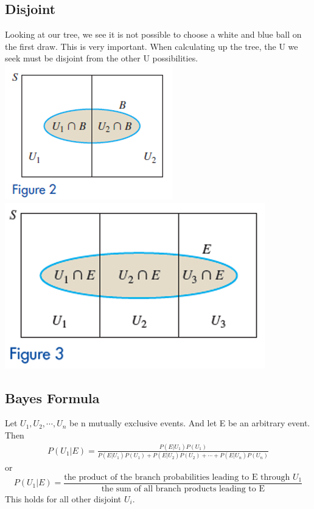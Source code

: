 \documentclass[14pt]{extarticle}
\begin{document}
\subsection{Disjoint}
Looking at our tree, we see it is not possible to choose a white and blue ball on the first draw. This is very important. When calculating up the tree, the U we seek must be disjoint from the other U possibilities.
\\
\includegraphics[width=0.4\linewidth]{partition2}
\includegraphics[width=0.5\linewidth]{partition3}
\\
\subsection{Bayes Formula}
\begin{tcolorbox}[enhanced jigsaw,colback=bg,boxrule=0pt,arc=0pt] 
	Let $U_1, U_2, \cdots, U_n$ be n mutually exclusive events. And let E be an arbitrary event. Then
	\begin{align*}
		P(U_1|E) = \frac{P(E|U_1)P(U_1)}{P(E|U_1)P(U_1) + P(E|U_2)P(U_2) + \cdots + P(E|U_n)P(U_n)}
	\end{align*}
	or
	$$P(U_1|E) =
	\frac{\text{
			the product of the branch probabilities leading to E through $U_1$}}
	{\text{
			the sum of all branch products leading to E}}$$
	This holds for all other disjoint $U_i$.
\end{tcolorbox}
\end{document}
